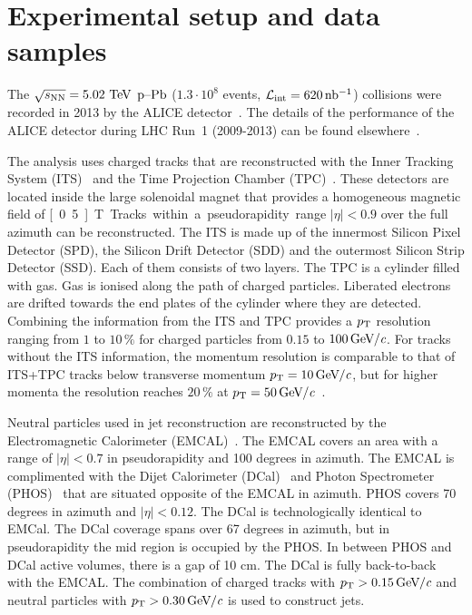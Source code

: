 
\section{Experimental setup and data samples}
\label{sec:experimentaldetails}
The $\sqrt{s_{\mathrm{NN}}} = 5.02~\mathrm{TeV}$ $\mbox{p--Pb}$ ($1.3 \cdot 10^{8}$ events, $\mathcal{L}_{\mathrm{int}} = \unit[620]{nb^{-1}}$) collisions were recorded in 2013 by the ALICE detector~\cite{aliceDetector}. The details of the performance of the ALICE detector during LHC Run~1 (2009-2013) can be found elsewhere~\cite{alicePerformance}.

The analysis uses charged tracks that are reconstructed with the Inner Tracking System (ITS)~\cite{aliceITS} and the Time Projection Chamber (TPC)~\cite{aliceTPC}. These detectors are located inside the large solenoidal magnet that provides a homogeneous magnetic field of \unit[0.5]{T}. Tracks within a pseudorapidity range $|\eta| < 0.9$ over the full azimuth can be reconstructed. The ITS is made up of the innermost Silicon Pixel Detector (SPD), the Silicon Drift Detector (SDD) and the outermost Silicon Strip Detector (SSD). Each of them consists of two layers. The TPC is a cylinder filled with gas. Gas is ionised along the path of charged particles. Liberated electrons are drifted towards the end plates of the cylinder where they are detected. Combining the information from the ITS and TPC provides a $p_{\rm T}$ resolution ranging from $1$ to $10\,\%$ for charged particles from $0.15$ to $\unit[100]{\GeVc}$. For tracks without the ITS information, the momentum resolution is comparable to that of ITS+TPC tracks below transverse momentum $\pt{} = \unit[10]{\GeVc}$, but for higher momenta the resolution reaches $20\,\%$ at $\pt{} = \unit[50]{\GeVc}$~\cite{alicePerformance,aliceBackgroundFluctuation}.

Neutral particles used in jet reconstruction are reconstructed by the Electromagnetic Calorimeter (EMCAL)~\cite{Cortese:2008zza}. The EMCAL covers an area with a range of $|\eta| < 0.7$  in pseudorapidity and 100 degrees in azimuth. The EMCAL is complimented with the Dijet Calorimeter (DCal)~\cite{DCAL} and Photon Spectrometer (PHOS)~\cite{PHOS} that are situated opposite of the EMCAL in azimuth. PHOS covers 70 degrees in azimuth and $\left| \eta \right| < 0.12$. The DCal is technologically identical to EMCal. The DCal coverage spans over 67 degrees in azimuth, but in pseudorapidity the mid region is occupied by the PHOS. In between PHOS and DCal active volumes, there is a gap of 10 cm. The DCal is fully back-to-back with the EMCAL.
The combination of charged tracks with  $\pt{} > \unit[0.15]{\GeVc}$ and neutral particles with $\pt{} > \unit[0.30]{\GeVc}$ is used to construct jets.

